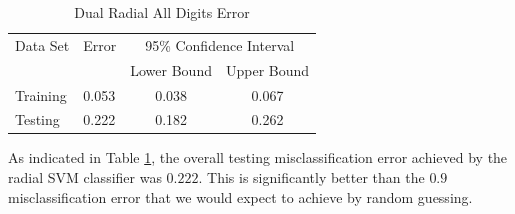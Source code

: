 \documentclass{article}
\begin{document}
\begin{table}
\caption{Dual Radial All Digits Error}
\begin{center}
\begin{tabular}{llcc}
\toprule
Data Set & Error & \multicolumn{2}{c}{95\% Confidence Interval} \\
\cmidrule(r){3-4}
& & Lower Bound & Upper Bound \\
\midrule
Training & 0.053 & 0.038 & 0.067 \\
Testing & 0.222 & 0.182 & 0.262 \\
\bottomrule
\end{tabular}
\end{center}
\label{tablefull}
\end{table}

As indicated in Table \ref{tablefull}, the overall testing misclassification error achieved by the radial SVM classifier was \(0.222\). This is significantly better than the \(0.9\) misclassification error that we would expect to achieve by random guessing.
\end{document}
